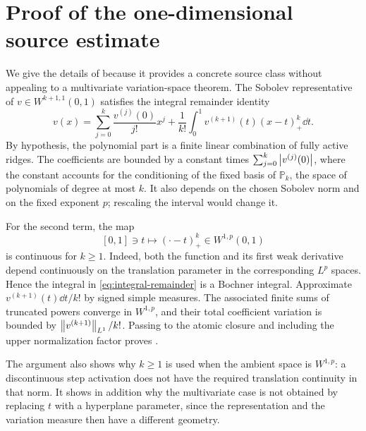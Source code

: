 \section{Proof of the one-dimensional source estimate}
\label{app:source}

We give the details of  because it provides a concrete source class without
appealing to a multivariate variation-space theorem. The Sobolev representative of
\(v\in W^{k+1,1}(0,1)\) satisfies the integral remainder identity
\begin{equation}
 v(x)=\sum_{j=0}^k\frac{v^{(j)}(0)}{j!}x^j
 +\frac1{k!}\int_0^1 v^{(k+1)}(t)(x-t)_+^k\dd t.
 \label{eq:integral-remainder}
\end{equation}
By hypothesis, the polynomial part is a finite linear combination of fully active ridges. The
coefficients are bounded by a constant times \(\sum_{j=0}^k\left\lvert v^{(j)}(0)\right\rvert\), where the constant
accounts for the conditioning of the fixed basis of \(\mathbb P_k\), the space of polynomials of
degree at most \(k\). It also depends on the chosen Sobolev norm and on the fixed exponent \(p\);
rescaling the interval would change it.

For the second term, the map
\[
 [0,1]\ni t\longmapsto (\cdot-t)_+^k\in W^{1,p}(0,1)
\]
is continuous for \(k\geq1\). Indeed, both the function and its first weak derivative depend
continuously on the translation parameter in the corresponding \(L^p\) spaces. Hence the integral in
\cref{eq:integral-remainder} is a Bochner integral. Approximate
\(v^{(k+1)}(t)\dd t/k!\) by signed simple measures. The associated finite sums of truncated powers
converge in \(W^{1,p}\), and their total coefficient variation is bounded by
\(\left\lVert v^{(k+1)}\right\rVert_{L^1}/k!\). Passing to the atomic closure and including the upper normalization factor
proves .

The argument also shows why \(k\geq1\) is used when the ambient space is \(W^{1,p}\): a discontinuous
step activation does not have the required translation continuity in that norm. It shows in addition
why the multivariate case is not obtained by replacing \(t\) with a hyperplane parameter, since the
representation and the variation measure then have a different geometry.

